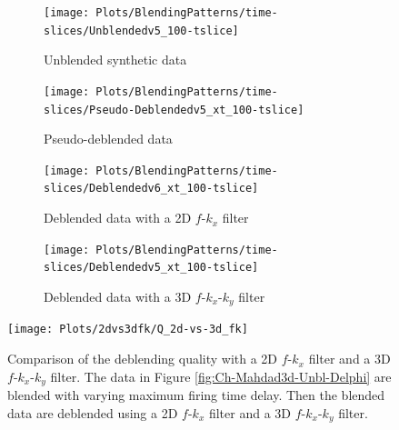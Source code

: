 \begin{figure}
	
	\centering
	\begin{subfigure}[t]{0.45\textwidth}
		\centering
		\texttt{[image: Plots/BlendingPatterns/time-slices/Unblendedv5\_100-tslice]}
		\caption{Unblended synthetic data}
		\label{fig:Ch-Mahdad3d-Unbl-Delphi-tslice}
	\end{subfigure}
	\centering
	\begin{subfigure}[t]{0.45\textwidth}
		\texttt{[image: Plots/BlendingPatterns/time-slices/Pseudo-Deblendedv5\_xt\_100-tslice]}
		\caption{Pseudo-deblended data}
		\label{fig:Ch-Mahdad3d-Deblending-Pseudo-Zoom-tslice}
	\end{subfigure}
	
	\par\bigskip

	\centering
	\begin{subfigure}[t]{0.45\textwidth}
		\texttt{[image: Plots/BlendingPatterns/time-slices/Deblendedv6\_xt\_100-tslice]}
		\caption{Deblended data with a 2D $f$-$k_x$ filter}
		\label{fig:Ch-Mahdad3d-Deblending-2dfk-tslice}
	\end{subfigure}
	\centering
	\begin{subfigure}[t]{0.45\textwidth}
		\texttt{[image: Plots/BlendingPatterns/time-slices/Deblendedv5\_xt\_100-tslice]}
		\caption{Deblended data with a 3D $f$-$k_x$-$k_y$ filter}
		\label{fig:Ch-Mahdad3d-Deblending-3dfk-tslice}
	\end{subfigure}
	
	\caption{}
	\label{fig:Ch-Mahdad3d-Deblending-2dvs3d-fk-tslice}
	
\end{figure}



\begin{figure}
	\centering
	\texttt{[image: Plots/2dvs3dfk/Q\_2d-vs-3d\_fk]}
	\caption{Comparison of the deblending quality with a 2D $f$-$k_x$ filter and a 3D $f$-$k_x$-$k_y$ filter. The data in Figure \ref{fig:Ch-Mahdad3d-Unbl-Delphi} are blended with varying maximum firing time delay. Then the blended data are deblended using a 2D $f$-$k_x$ filter and a 3D $f$-$k_x$-$k_y$ filter.}
	\label{fig:Ch-Mahdad3d-2dvs3dfk}
\end{figure}


















